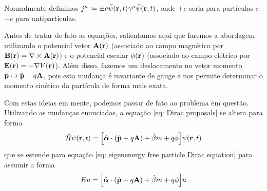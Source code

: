    \begin{note}{}
        Normalmente definimos $j^{\mu} \coloneqq \pm e\bar{\psi}(\vb{r},t)\gamma^{\mu}\bar{\psi}(\vb{r},t)$, onde $+e$ seria para partículas e $-e$ para antipartículas.
    \end{note}

    \begin{example}
        Antes de tratar de fato as equações, salientamos aqui que faremos a abordagem utilizando o potencial vetor $\vb{A}(\vb{r})$ (associado ao campo magnético por $\vb{B}(\vb{r}) = \vb{\nabla}\times\vb{A}(\vb{r})$) e o potencial escalar $\phi(\vb{r})$ (associado ao campo elétrico por $\vb{E}(\vb{r}) = -\vb{\nabla}V(\vb{r})$). Além disso, fazemos um deslocamento no vetor momento $\hat{\vb{p}} \mapsto \hat{\vb{p}} - q\vb{A}$, pois esta mudança é invariante de gauge e nos permite determinar o momento cinético da partícula de forma mais exata. 

        Com estas ideias em mente, podemos passar de fato ao problema em questão. Utilizando as mudanças enunciadas, a equação \eqref{eq: Dirac proposals} se altera para forma
            \begin{equation*}
                \hat{\mathcal{H}}\psi(\vb{r},t) = \qty[\hat{\boldsymbol{\alpha}}\cdot(\hat{\vb{p}} - q\vb{A}) + \hat{\beta}m + q\phi]\psi(\vb{r},t)
            \end{equation*}
        que se estende para equação \eqref{eq: eigenenergy free particle Dirac equation} para assumir a forma
            \begin{equation}\label{eq: eigenenergy for a dirac particle}
                Eu = \qty[\hat{\boldsymbol{\alpha}}\cdot(\hat{\vb{p}} - q\vb{A}) + \hat{\beta}m + q\phi]u
            \end{equation}


\end{example}
